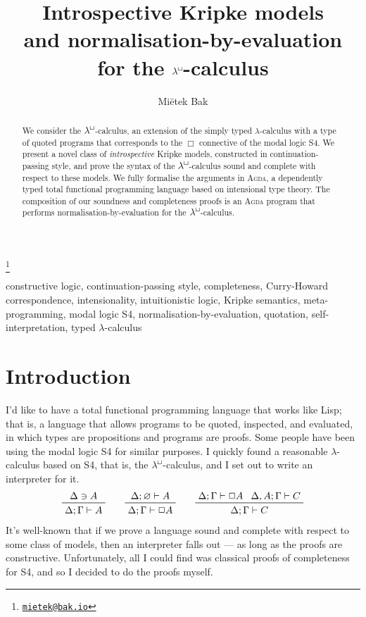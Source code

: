 \documentclass{entcs}
\numberwithin{equation}{thm}
\newcommand{\lambdabox}{\lambda^{\mkern-1mu\sq\mkern-2mu}}
\renewcommand{\:}{\mathrel{:}}
\newcommand{\0}{\varnothing}
\renewcommand{\and}{\mathbin{\wedge}}
\newcommand{\sq}{\Box}
\renewcommand{\e}{\mathrel{\vdash}}
\begin{document}
\begin{frontmatter}

\title{Introspective Kripke models\\and normalisation-by-evaluation\\for the $\lambdabox$-calculus}

\author{Mi\"{e}tek Bak}

\address{Least Fixed Ltd, Cambridge, UK}

\thanks[email]{\href{mailto:mietek@bak.io}{\textnormal{\texttt{mietek@bak.io}}}}


\begin{abstract}
  We consider the $\lambdabox$-calculus, an extension of the simply typed $\lambda$-calculus with a type of quoted programs that corresponds to the $\sq$ connective of the modal logic S4.
  We present a novel class of \emph{introspective} Kripke models, constructed in continuation-passing style, and prove the syntax of the $\lambdabox$-calculus sound and complete with respect to these models.
  We fully formalise the arguments in \textsc{Agda}, a dependently typed total functional programming language based on intensional type theory.
  The composition of our soundness and completeness proofs is an \textsc{Agda} program that performs normalisation-by-evaluation for the $\lambdabox$-calculus.
\end{abstract}

\begin{keyword}
  constructive logic, continuation-passing style, completeness, Curry-Howard correspondence, intensionality, intuitionistic logic, Kripke semantics, meta-programming, modal logic S4, normalisation-by-evaluation, quotation, self-interpretation, typed $\lambda$-calculus
\end{keyword}

\end{frontmatter}




\section{Introduction}


I'd like to have a total functional programming language that works like Lisp; that is, a language that allows programs to be quoted, inspected, and evaluated, in which types are propositions and programs are proofs.
Some people have been using the modal logic S4 for similar purposes.
I quickly found a reasonable $\lambda$-calculus based on S4, that is, the $\lambdabox$-calculus, and I set out to write an interpreter for it.
\begin{gather*}
  \prftree{\Delta \ni A}{\Delta; \Gamma \e A}\qquad
  \prftree{\Delta; \0 \e A}{\Delta; \Gamma \e \sq A}\qquad
  \prftree{\Delta; \Gamma \e \sq A}{\Delta, A; \Gamma \e C}{\Delta; \Gamma \e C}
\end{gather*}
It's well-known that if we prove a language sound and complete with respect to some class of models, then an interpreter falls out --- as long as the proofs are constructive.
Unfortunately, all I could find was classical proofs of completeness for S4, and so I decided to do the proofs myself.
\end{document}
